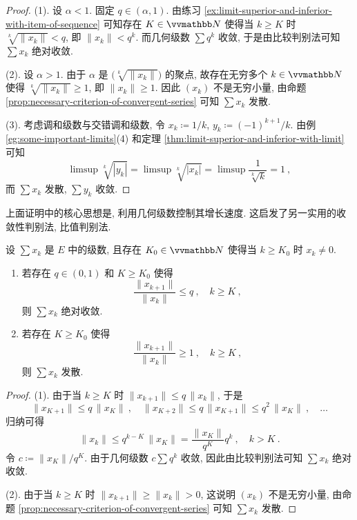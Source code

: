 \begin{proof}
    (1). 设 \(\alpha < 1\). 固定 \(q \in (\alpha, 1)\). 由练习 \ref{ex:limit-superior-and-inferior-with-item-of-sequence} 可知存在 \(K \in \N\) 使得当 \(k \geq K\) 时 \(\sqrt[k]{\|x_k\|} < q\), 即 \(\|x_k\| < q^k\). 而几何级数 \(\sum q^k\) 收敛, 于是由比较判别法可知 \(\sum x_k\) 绝对收敛.

    (2). 设 \(\alpha > 1\). 由于 \(\alpha\) 是 \(\bigl(\sqrt[k]{\|x_k\|}\bigr)\) 的聚点, 故存在无穷多个 \(k \in \N\) 使得 \(\sqrt[k]{\|x_k\|} \geq 1\), 即 \(\|x_k\| \geq 1\). 因此 \((x_k)\) 不是无穷小量, 由命题 \ref{prop:necessary-criterion-of-convergent-series} 可知 \(\sum x_k\) 发散.

    (3). 考虑调和级数与交错调和级数, 令 \(x_k \coloneqq 1 / k\), \(y_k \coloneqq (- 1)^{k + 1} / k\). 由例 \ref{eg:some-important-limits}(4) 和定理 \ref{thm:limit-superior-and-inferior-with-limit} 可知
    \[
        \limsup \sqrt[k]{|y_k|} = \limsup \sqrt[k]{|x_k|} = \limsup \frac{1}{\sqrt[k]{k}} = 1\ ,
    \]
    而 \(\sum x_k\) 发散, \(\sum y_k\) 收敛.
\end{proof}

上面证明中的核心思想是, 利用几何级数控制其增长速度. 这启发了另一实用的收敛性判别法, 比值判别法.

\begin{theorem}[比值判别法]
    设 \(\sum x_k\) 是 \(E\) 中的级数, 且存在 \(K_0 \in \N\) 使得当 \(k \geq K_0\) 时 \(x_k \neq 0\).
    \begin{enumerate}
        \item 若存在 \(q \in (0, 1)\) 和 \(K \geq K_0\) 使得
        \[
            \frac{\|x_{k + 1}\|}{\|x_k\|} \leq q\ ,\quad k \geq K\ ,
        \]
        则 \(\sum x_k\) 绝对收敛.
        \item 若存在 \(K \geq K_0\) 使得
        \[
            \frac{\|x_{k + 1}\|}{\|x_k\|} \geq 1\ ,\quad k \geq K\ ,
        \]
        则 \(\sum x_k\) 发散.
    \end{enumerate}
\end{theorem}

\begin{proof}
    (1). 由于当 \(k \geq K\) 时 \(\|x_{k + 1}\| \leq q\, \|x_k\|\), 于是
    \[
        \|x_{K + 1}\| \leq q\, \|x_K\|\ ,\quad \|x_{K + 2}\| \leq q\, \|x_{K + 1}\| \leq q^2\, \|x_K\|\ ,\quad \ldots
    \]
    归纳可得
    \[
        \|x_k\| \leq q^{k - K}\, \|x_K\| = \frac{\|x_K\|}{q^K} q^k\ ,\quad k > K\ .
    \]
    令 \(c \coloneqq \|x_K\| \big/ q^K\). 由于几何级数 \(c \sum q^k\) 收敛, 因此由比较判别法可知 \(\sum x_k\) 绝对收敛.

    (2). 由于当 \(k \geq K\) 时 \(\|x_{k + 1}\| \geq \|x_k\| > 0\), 这说明 \((x_k)\) 不是无穷小量, 由命题 \ref{prop:necessary-criterion-of-convergent-series} 可知 \(\sum x_k\) 发散.
\end{proof}

